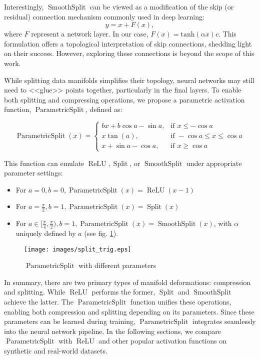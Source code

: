 \documentclass{esannV2}
\DeclareMathOperator{\relu}{\mathrm{ReLU}}
\DeclareMathOperator{\signsplit}{\mathrm{Split}}
\DeclareMathOperator{\smoothsplit}{\mathrm{SmoothSplit}}
\DeclareMathOperator{\parametricsplit}{\mathrm{ParametricSplit}}
\begin{document}
Interestingly, \( \smoothsplit \) can be viewed as a modification of the skip (or residual) connection mechanism commonly used in deep learning: $$y = x + F(x),$$where $F$ represent a network layer. In our case, $F(x) = \mathrm{tanh}(\alpha x)c.$ This formulation offers a topological interpretation of skip connections, shedding light on their success. However, exploring these connections is beyond the scope of this work.

While splitting data manifolds simplifies their topology, neural networks may still need to <<glue>> points together, particularly in the final layers. To enable both splitting and compressing operations, we propose a parametric activation function, \( \parametricsplit \), defined as:

$$ \parametricsplit(x) = \begin{cases}
    bx + b\cos{a} - \sin{a}, & \text{if } x\leq-\cos{a}              \\
    x\tan(a),                & \text{if } -\cos{a} \le x \le \cos{a} \\
    x + \sin{a} - \cos{a},   & \text{if } x\geq \cos{a}
  \end{cases} $$

This function can emulate $\relu, \signsplit$, or $\smoothsplit$ under appropriate parameter settings:
\begin{itemize}
  \item For $a=0, b=0, \parametricsplit(x) = \relu(x-1)$
  \item For $a=\frac{\pi}{2}, b=1, \parametricsplit(x) = \signsplit(x)$
  \item For $a\in[\frac{\pi}{4}, \frac{\pi}{2}), b=1, \parametricsplit(x)=\smoothsplit(x)$, with $\alpha$ uniquely defined by $a$ (see fig. \ref{fig:split-trig}).  %
\end{itemize}

\begin{figure}[!htbp]
  \centering
  \texttt{[image: images/split\_trig.eps]}
  \caption{$\parametricsplit$ with different parameters}
  \label{fig:split-trig}
\end{figure}

In summary, there are two primary types of manifold deformations: compression and splitting. While \( \relu \) performs the former, \( \signsplit \) and \( \smoothsplit \) achieve the latter. The \( \parametricsplit \) function unifies these operations, enabling both compression and splitting depending on its parameters. Since these parameters can be learned during training, \( \parametricsplit \) integrates seamlessly into the neural network pipeline. In the following sections, we compare \( \parametricsplit \) with \( \relu \) and other popular activation functions on synthetic and real-world datasets.
\end{document}
